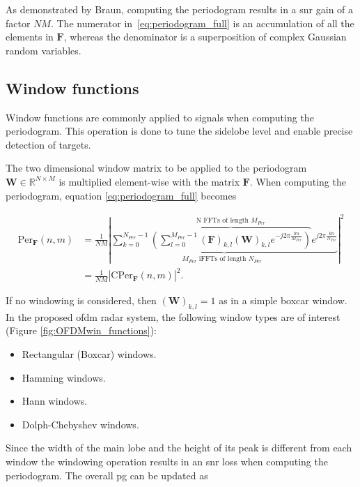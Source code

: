     
    

    As demonstrated by Braun, computing the periodogram results in a \gls{snr} gain of a factor $NM$. The numerator in~\eqref{eq:periodogram_full} is an accumulation of all the elements in $\mathbf F$, whereas the denominator is a superposition of complex Gaussian random variables.
    
    \newpage
	\subsection{Window functions}
	
	Window functions are commonly applied to signals when computing the periodogram. This operation is done to tune the sidelobe level and enable precise detection of targets. 
	
	The two dimensional window matrix to be applied to the periodogram $\mathbf W \in \mathbb{R}^{N\times M}$ is multiplied element-wise with the matrix $\mathbf F$. When computing the periodogram, equation \eqref{eq:periodogram_full} becomes
	
	
	   \begin{align}
		\text{Per}_{\mathbf F}(n,m) &= \frac{1}{NM} \left| \underbrace{ \sum_{k=0}^{N_{Per}-1}  \overbrace{\left( \sum_{l=0}^{M_{Per}-1} (\bm{F})_{k,l} (\mathbf W)_{k,l} e^{-j2\pi \frac{lm}{M_{Per}}} \right)}^{\text{N FFTs of length $M_{Per}$}}  e^{j2\pi\frac{kn}{N_{Per}}}}_{ \text{$M_{Per}$ iFFTs of length $N_{Per}$ }} \right| ^ 2\\
		&= \frac{1}{NM} \left| \text{CPer}_{\bm{F}}(n,m) \right| ^ 2.
		\end{align}
	 
	 If no windowing is considered, then $(\mathbf W)_{k,l} = 1$ as in a simple boxcar window.
	 In the proposed \gls{ofdm} radar system, the following window types are of interest (Figure \ref{fig:OFDMwin_functions}):
	 
	 \begin{itemize}
	 	\item Rectangular (Boxcar) windows.
	 	\item Hamming windows.
	 	\item Hann windows.
	 	\item Dolph-Chebyshev windows.
	 \end{itemize}
	
	
	Since the width of the main lobe and the height of its peak is different from each window the windowing operation results in an \gls{snr} loss when computing the periodogram.
	The overall \gls{pg} can be updated as
	
